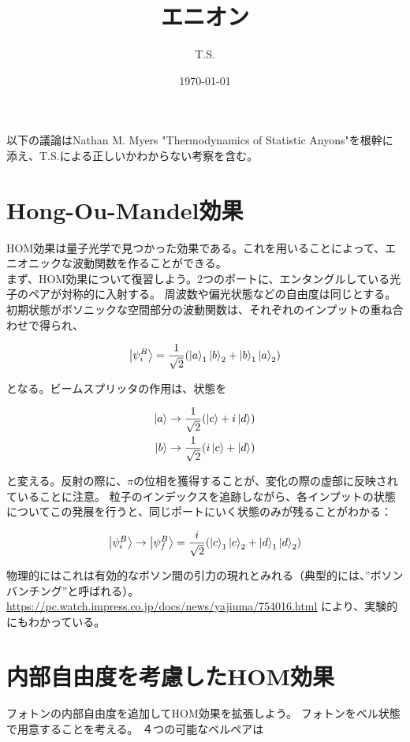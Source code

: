 \documentclass[a4paper,11pt]{jsarticle}
\numberwithin{equation}{section}
\begin{document}
\title{エニオン}
\author{T.S.}
\date{\today}
\maketitle
\tableofcontents


以下の議論はNathan M. Myers "Thermodynamics of Statistic Anyons"を根幹に添え、T.S.による正しいかわからない考察を含む。\\

\section{Hong-Ou-Mandel効果}
HOM効果は量子光学で見つかった効果である。これを用いることによって、エニオニックな波動関数を作ることができる。\\
まず、HOM効果について復習しよう。2つのポートに、エンタングルしている光子のペアが対称的に入射する。
周波数や偏光状態などの自由度は同じとする。
初期状態がボソニックな空間部分の波動関数は、それぞれのインプットの重ね合わせで得られ、

\begin{align}
\ket{\psi_i^B}=\frac{1}{\sqrt{2}}(\ket{a}_1\ket{b}_2+\ket{b}_1\ket{a}_2)
\end{align}

となる。ビームスプリッタの作用は、状態を

\begin{align}
\ket{a}\to\frac{1}{\sqrt{2}}(\ket{c}+i\ket{d})\\
\ket{b}\to\frac{1}{\sqrt{2}}(i\ket{c}+\ket{d})
\end{align}

と変える。反射の際に、$\pi$の位相を獲得することが、変化の際の虚部に反映されていることに注意。
粒子のインデックスを追跡しながら、各インプットの状態についてこの発展を行うと、同じポートにいく状態のみが残ることがわかる：

\begin{align}
\ket{\psi_i^B}\to\ket{\psi_f^B}=\frac{i}{\sqrt{2}}(\ket{c}_1\ket{c}_2+\ket{d}_1\ket{d}_2)
\end{align}

物理的にはこれは有効的なボソン間の引力の現れとみれる（典型的には、”ボソンバンチング”と呼ばれる）。
\url{https://pc.watch.impress.co.jp/docs/news/yajiuma/754016.html} により、実験的にもわかっている。

\section{内部自由度を考慮したHOM効果}
フォトンの内部自由度を追加してHOM効果を拡張しよう。
フォトンをベル状態で用意することを考える。
４つの可能なベルペアは
\end{document}
